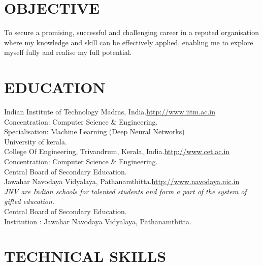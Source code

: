 \documentclass[11pt, a4paper, sans]{moderncv}
\begin{document}
\maketitle

\section{OBJECTIVE}
To secure a promising, successful and challenging career in a reputed organisation where my knowledge and skill can be effectively applied, enabling me to explore myself fully and realise my full potential.\\


\section{EDUCATION}
{
Indian Institute of Technology Madras, India.\hfill \url{http://www.iitm.ac.in}\\
Concentration: Computer Science \& Engineering.\\
Specialisation: Machine Learning (Deep Neural Networks)\\
}
{
University of kerala.\\
College Of Engineering, Trivandrum, Kerala, India.\hfill\url{http://www.cet.ac.in}\\
Concentration: Computer Science \& Engineering.\\
}
{
Central Board of Secondary Education.\\
Jawahar Navodaya Vidyalaya, Pathanamthitta.\hfill \url{http://www.navodaya.nic.in}\\
\textit{JNV are Indian schools for talented students and form a part of the system of gifted education.}\\
}
{
Central Board of Secondary Education.\\
Institution : Jawahar Navodaya Vidyalaya, Pathanamthitta. \\
}

\section{TECHNICAL SKILLS}
\end{document}

